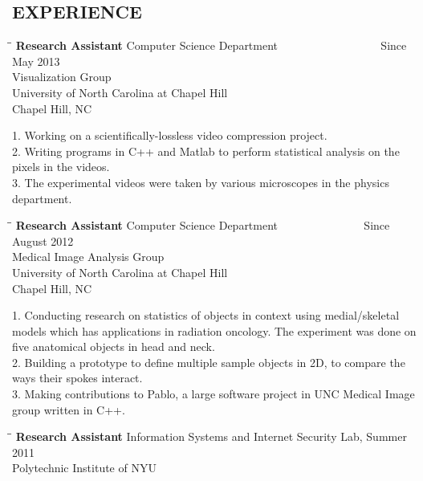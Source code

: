 \documentclass{res}
\begin{document}
\begin{resume}
\section{EXPERIENCE}
    \vspace{-0.1in}
    \begin{tabbing}
   \hspace{2.3in}\= \hspace{2.6in}\= \kill %
    {\bf Research Assistant} \>Computer Science Department ~~~~~~~~~~~~~~~~~  Since May 2013\\
    \> Visualization Group \\ 
    \> University of North Carolina at Chapel Hill  \\
                          \>Chapel Hill, NC
   \end{tabbing}\vspace{-15pt}
    1. Working on a scientifically-lossless video compression project. \\
    2. Writing programs in C++ and Matlab to perform statistical analysis on the pixels in the videos. \\
    3. The experimental videos were taken by various microscopes in the physics department. 
   \vspace{-0.1in}	
   \begin{tabbing}
   \hspace{2.3in}\= \hspace{2.6in}\= \kill %
    {\bf Research Assistant} \>Computer Science Department ~~~~~~~~~~~~~~  Since August 2012\\
    \> Medical Image Analysis Group \\
    \> University of North Carolina at Chapel Hill  \\
                          \>Chapel Hill, NC
   \end{tabbing}\vspace{-15pt}
    1. Conducting research on statistics of objects in context using medial/skeletal models which has applications in radiation oncology. The experiment was done on five anatomical objects in head and neck.\\
    2. Building a prototype to define multiple sample objects in 2D, to compare the ways their spokes interact. \\
    3. Making contributions to Pablo, a large software project in UNC Medical Image group written in C++.
   \vspace{-0.1in}	
   \begin{tabbing}
   \hspace{2.3in}\= \hspace{2.6in}\= \kill %
    {\bf Research Assistant} \> Information Systems and Internet Security Lab, Summer 2011 \\
    \>Polytechnic Institute of NYU  \\


\end{tabbing}
\end{resume}
\end{document}
